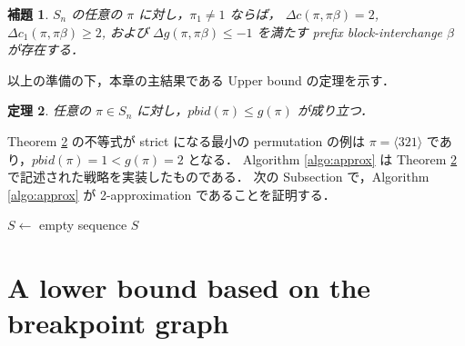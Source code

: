 \documentclass[paper=a4,fontsize=11pt,report,oneside]{jlreq}
\newtheorem{theorem}{定理}[chapter]
\newtheorem{lemma}[theorem]{補題}
\begin{document}
\begin{lemma} \label{lem:reduction}
    $S_n$ の任意の $\pi$ に対し，$\pi_1 \neq 1$ ならば，
    $\Delta c(\pi, \pi\beta) = 2$, $\Delta c_1(\pi, \pi\beta) \ge 2$,
    および $\Delta g(\pi, \pi\beta) \le -1$ を満たす
    prefix block-interchange $\beta$ が存在する．
\end{lemma}


以上の準備の下，本章の主結果である Upper bound の定理を示す．

\begin{theorem} \label{thm:upperbound_main}
    任意の $\pi \in S_n$ に対し，$pbid(\pi) \le g(\pi)$ が成り立つ．
\end{theorem}


Theorem \ref{thm:upperbound_main} の不等式が strict になる最小の permutation の例は
$\pi = \langle 3 2 1 \rangle$ であり，$pbid(\pi) = 1 < g(\pi) = 2$ となる．
Algorithm \ref{algo:approx} は Theorem \ref{thm:upperbound_main} で記述された戦略を実装したものである．
次の Subsection で，Algorithm \ref{algo:approx} が 2-approximation であることを証明する．

\begin{algorithm}[H]
\caption{ApproximateSbpbi($\pi$)}
\label{algo:approx}
$S \leftarrow$ empty sequence\;
\Return $S$\;
\end{algorithm}

\section{A lower bound based on the breakpoint graph}
\end{document}
